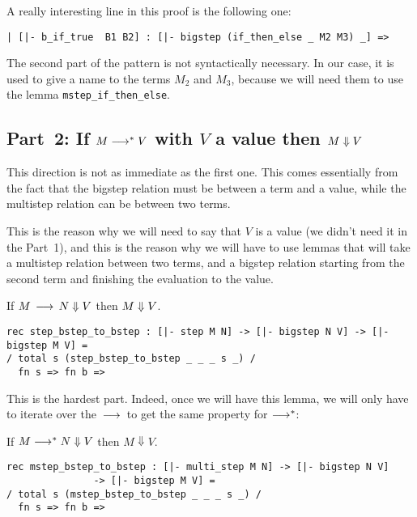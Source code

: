 A really interesting line in this proof is the following one:
\begin{center}
\lstinline!| [|- b_if_true  B1 B2] : [|- bigstep (if_then_else _ M2 M3) _] =>!
\end{center}
The second part of the pattern is not syntactically necessary. In our case, it
is used to give a name to the terms $M_2$ and $M_3$, because we will need them
to use the lemma \lstinline!mstep_if_then_else!.

\subsection{Part~2: If $M \longrightarrow^* V$ with $V$ a value then $M \Downarrow V$ }

This direction is not as immediate as the first one. This comes essentially from
the fact that the bigstep relation must be between a term and a value, while the
multistep relation can be between two terms.

This is the reason why we will need to say that $V$ is a value (we didn't need
it in the Part~1), and this is the reason why we will have to use lemmas that
will take a multistep relation between two terms, and a bigstep relation
starting from the second term and finishing the evaluation to the value.

\begin{lemma}\label{lem:step-bstep-to-bstep}
  If $M \mathrel{\,\longrightarrow\,} N \Downarrow V$ then $M \Downarrow V$.
  \em
  \begin{lstlisting}
rec step_bstep_to_bstep : [|- step M N] -> [|- bigstep N V] -> [|- bigstep M V] =
/ total s (step_bstep_to_bstep _ _ _ s _) /
  fn s => fn b =>
  \end{lstlisting}
\end{lemma}

This is the hardest part. Indeed, once we will have this lemma, we will only
have to iterate over the $\mathrel{\,\longrightarrow\,}$ to get the same property for $\longrightarrow^*$:

\begin{lemma}\label{lem:mstep-bstep-to-bstep}
  If $M \longrightarrow^* N \Downarrow V$ then $M \Downarrow V$.
  \em
  \begin{lstlisting}
rec mstep_bstep_to_bstep : [|- multi_step M N] -> [|- bigstep N V]
			   -> [|- bigstep M V] =
/ total s (mstep_bstep_to_bstep _ _ _ s _) /
  fn s => fn b =>
  \end{lstlisting}
\end{lemma}

